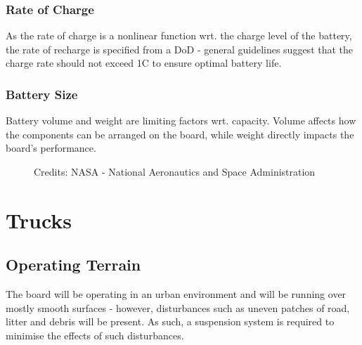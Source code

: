\documentclass[journal,10pt]{IEEEtran}
\begin{document}
        \subsubsection{Rate of Charge}
            As the rate of charge is a nonlinear function wrt. the charge level of the battery, the rate of recharge is specified from a DoD - general guidelines suggest that the charge rate should not exceed 1C to ensure optimal battery life.
        \subsubsection{Battery Size}
        Battery volume and weight are limiting factors wrt. capacity. Volume affects how the components can be arranged on the board, while weight directly impacts the board's performance.    
            \begin{figure}[H]
                \centering
                \caption{Credits: NASA - National Aeronautics and Space Administration}
                \label{fig:Battery Size}
            \end{figure}
\section{Trucks}
    \subsection{Operating Terrain}
        The board will be operating in an urban environment and will be running over mostly smooth surfaces - however, disturbances such as uneven patches of road, litter and debris will be present. As such, a suspension system is required to minimise the effects of such disturbances.
\end{document}
